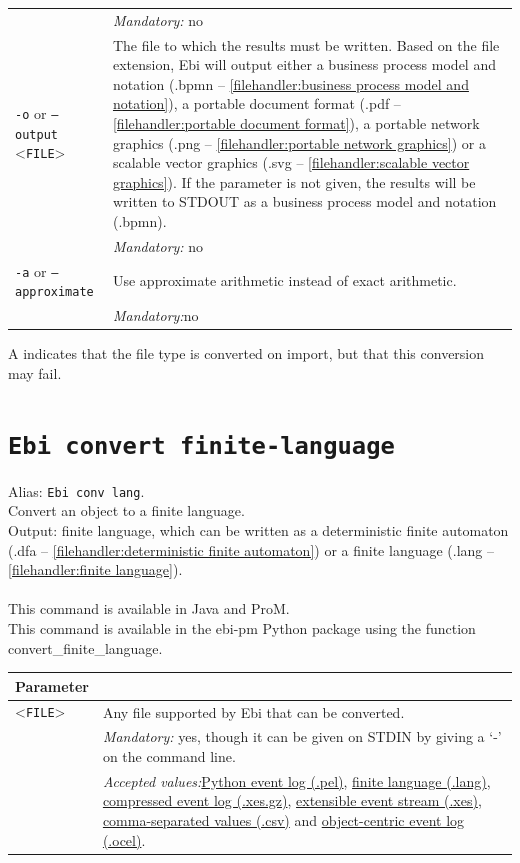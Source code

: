 {\begin{tabularx}{\linewidth}{lX}
&\textit{Mandatory:} \quad no\\
\texttt{-o} or \texttt{--output} <\texttt{FILE}> &
The file to which the results must be written. Based on the file extension, Ebi will output either a business process model and notation (.bpmn -- \cref{filehandler:business process model and notation}), a portable document format (.pdf -- \cref{filehandler:portable document format}), a portable network graphics (.png -- \cref{filehandler:portable network graphics}) or a scalable vector graphics (.svg -- \cref{filehandler:scalable vector graphics}).
If the parameter is not given, the results will be written to STDOUT as a business process model and notation (.bpmn).\\
&\textit{Mandatory:} \quad no\\
\texttt{-a} or \texttt{--approximate} & Use approximate arithmetic instead of exact arithmetic.\\
&\textit{Mandatory:}\quad no\\
\bottomrule
\end{tabularx}
A \textdagger{} indicates that the file type is converted on import, but that this conversion may fail.
\clearpage\section{\texttt{Ebi convert finite-language}}
\label{command:Ebi convert finite-language}
Alias: \texttt{Ebi conv lang}.\\
Convert an object to a finite language.\\
\noindent Output: finite language, which can be written as a deterministic finite automaton (.dfa -- \cref{filehandler:deterministic finite automaton}) or a finite language (.lang -- \cref{filehandler:finite language}).\\
\\This command is available in Java and ProM.
\\This command is available in the ebi-pm Python package using the function convert\_finite\_language.
\begin{tabularx}{\linewidth}{lX}
\toprule
Parameter \\\midrule
<\texttt{FILE}>&Any file supported by Ebi that can be converted.\\
&\textit{Mandatory:} \quad yes, though it can be given on STDIN by giving a `-' on the command line.\\
&\textit{Accepted values:}\quad \hyperref[filehandler:Python event log]{Python event log (.pel)}, \hyperref[filehandler:finite language]{finite language (.lang)}, \hyperref[filehandler:compressed event log]{compressed event log (.xes.gz)}, \hyperref[filehandler:extensible event stream]{extensible event stream (.xes)}, \hyperref[filehandler:comma-separated values]{comma-separated values (.csv)} and \hyperref[filehandler:object-centric event log]{object-centric event log (.ocel)}.\\

\end{tabularx}}
